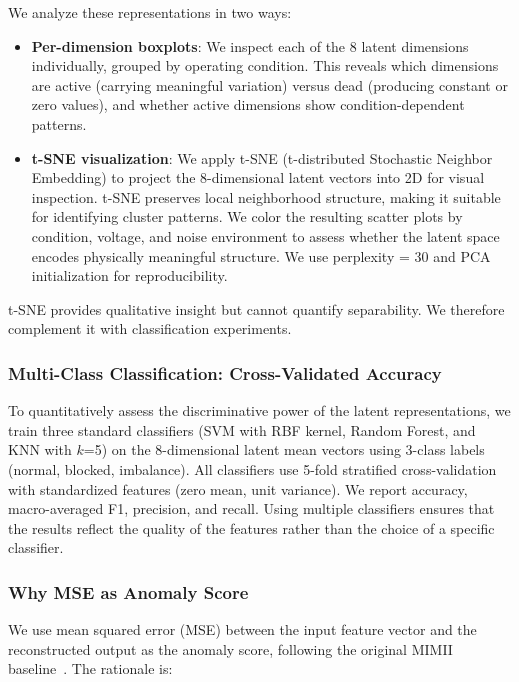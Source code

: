\documentclass[sigconf]{acmart}
\begin{document}
We analyze these representations in two ways:

\begin{itemize}
    \item \textbf{Per-dimension boxplots}: We inspect each of the 8 latent dimensions individually, grouped by operating condition. This reveals which dimensions are active (carrying meaningful variation) versus dead (producing constant or zero values), and whether active dimensions show condition-dependent patterns.
    \item \textbf{t-SNE visualization}: We apply t-SNE (t-distributed Stochastic Neighbor Embedding) to project the 8-dimensional latent vectors into 2D for visual inspection. t-SNE preserves local neighborhood structure, making it suitable for identifying cluster patterns. We color the resulting scatter plots by condition, voltage, and noise environment to assess whether the latent space encodes physically meaningful structure. We use perplexity = 30 and PCA initialization for reproducibility.
\end{itemize}

t-SNE provides qualitative insight but cannot quantify separability. We therefore complement it with classification experiments.

\subsubsection{Multi-Class Classification: Cross-Validated Accuracy}

To quantitatively assess the discriminative power of the latent representations, we train three standard classifiers (SVM with RBF kernel, Random Forest, and KNN with $k$=5) on the 8-dimensional latent mean vectors using 3-class labels (normal, blocked, imbalance). All classifiers use 5-fold stratified cross-validation with standardized features (zero mean, unit variance). We report accuracy, macro-averaged F1, precision, and recall. Using multiple classifiers ensures that the results reflect the quality of the features rather than the choice of a specific classifier.

\subsubsection{Why MSE as Anomaly Score}

We use mean squared error (MSE) between the input feature vector and the reconstructed output as the anomaly score, following the original MIMII baseline~\cite{purohit2019mimii}. The rationale is:
\end{document}
